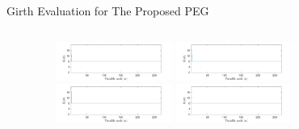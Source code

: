 \documentclass[11pt, aspectratio=169]{beamer}
\begin{document}
\begin{frame}{Girth Evaluation for The Proposed PEG}
\begin{columns}
\begin{column}{0.5\textwidth}
		\end{column}
		\begin{column}{0.55\textwidth}  
			\begin{center}
				{\footnotesize
					\begin{figure}[tb]
					\centering
					\hspace{-0.5 cm}
					\begin{minipage}{.5\linewidth}
						\includegraphics[width=1.5in]{gambarafa/girth/girthpeg4-9.pdf}
					\end{minipage}
					\hfill
						\hspace{-0.5 cm}
					\begin{minipage}{.5\linewidth}
										\hspace{-0.75 cm}
						\includegraphics[width=1.5in]{gambarafa/girth/girthpeg3-5.pdf}
					\end{minipage}
					\hspace{-0.2 cm}
					\begin{minipage}{.5\linewidth}
						\hspace{-0.5 cm}
						\includegraphics[width=1.5in]{gambarafa/girth/girthpeg2-3.pdf}
					\end{minipage}
					\hfill
					\hspace{-0.2 cm}
					\begin{minipage}{.5\linewidth}
										\hspace{-0.75 cm}
						\includegraphics[width=1.5in]{gambarafa/girth/girthpeg11-15.pdf}

\end{minipage}
\end{figure}}
\end{center}
\end{column}
\end{columns}
\end{frame}
\end{document}
